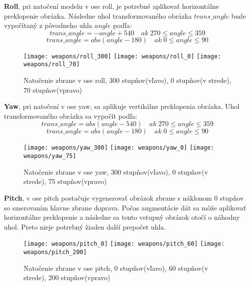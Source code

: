 \textbf{Roll}, pri natočení modelu v ose roll, je potrebné aplikovať horizontálne preklopenie obrázka.
Následne uhol transformovaného obrázka $trans\_angle$ bude vypočítaný z pôvodneho uhla $angle$ podľa:
\begin{equation}
    trans\_angle = -angle + 540 \quad ak \; 270 \leq angle \leq 359
\end{equation}
\begin{equation}
    trans\_angle = abs(angle - 180) \quad ak \; 0 \leq angle \leq 90
\end{equation}

\begin{figure}[H]
    \centering
    \texttt{[image: weapons/roll\_300]}
    \quad
    \texttt{[image: weapons/roll\_0]}
    \quad
    \texttt{[image: weapons/roll\_70]}
    \caption{Natočenie zbrane v ose roll, 300 stupňov(vľavo), 0 stupňov(v strede), 70 stupňov(vpravo)}
    \label{pic:rollrotation}
\end{figure}

\textbf{Yaw}, pri natočení v ose yaw, sa aplikuje vertikálne preklopenia obrázka.
Uhol transformovaného obrázka sa vypočít podľa:
\begin{equation}
    trans\_angle = abs(angle - 540) \quad ak \; 270 \leq angle \leq 359
\end{equation}
\begin{equation}
    trans\_angle = abs(angle - 180) \quad ak \; 0 \leq angle \leq 90
\end{equation}

\begin{figure}[H]
    \centering
    \texttt{[image: weapons/yaw\_300]}
    \quad
    \texttt{[image: weapons/yaw\_0]}
    \quad
    \texttt{[image: weapons/yaw\_75]}
    \caption{Natočenie zbrane v ose yaw, 300 stupňov(vľavo), 0 stupňov(v strede), 75 stupňov(vpravo)}
    \label{pic:yawrotation}
\end{figure}

\textbf{Pitch}, v ose pitch postačuje vygenerovať obrázok zbrane s náklonom 0 stupňov so smerovaním hlavne zbrane doprava.
Počas augmentácie dát sa môže aplikovať horizontálne preklopenie a následne sa tento vstupný obrázok otočí o náhodny uhol.
Preto nieje potrebný žiaden další prepočet uhla.

\begin{figure}[H]
    \centering
    \texttt{[image: weapons/pitch\_0]}
    \quad
    \texttt{[image: weapons/pitch\_60]}
    \quad
    \texttt{[image: weapons/pitch\_200]}
    \caption{Natočenie zbrane v ose pitch, 0 stupňov(vľavo), 60 stupňov(v strede), 200 stupňov(vpravo)}
    \label{pic:yawrotation}
\end{figure}
